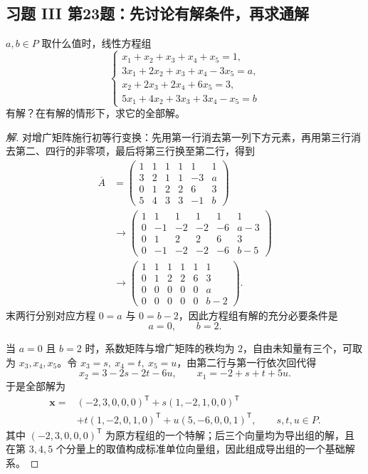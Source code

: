 \documentclass[UTF8, fontset=fandol, a4paper, 12pt]{ctexart}
\newcommand{\vx}{\boldsymbol{x}}
\theoremstyle{definition}
\begin{document}
\subsection{习题 III 第23题：先讨论有解条件，再求通解}

$a,b\in P$ 取什么值时，线性方程组
\[
 \begin{cases}
 x_1+x_2+x_3+x_4+x_5=1,\\
 3x_1+2x_2+x_3+x_4-3x_5=a,\\
 x_2+2x_3+2x_4+6x_5=3,\\
 5x_1+4x_2+3x_3+3x_4-x_5=b
 \end{cases}
\]
有解？在有解的情形下，求它的全部解。

\begin{proof}[解]
对增广矩阵施行初等行变换：先用第一行消去第一列下方元素，再用第三行消去第二、四行的非零项，最后将第三行换至第二行，得到
\begin{align*}
 \overline A
 &=\left(\begin{array}{rrrrr|r}1&1&1&1&1&1\\3&2&1&1&-3&a\\0&1&2&2&6&3\\5&4&3&3&-1&b\end{array}\right)\\
 &\longrightarrow
 \left(\begin{array}{rrrrr|r}1&1&1&1&1&1\\0&-1&-2&-2&-6&a-3\\0&1&2&2&6&3\\0&-1&-2&-2&-6&b-5\end{array}\right)\\
 &\longrightarrow
 \left(\begin{array}{rrrrr|r}1&1&1&1&1&1\\0&1&2&2&6&3\\0&0&0&0&0&a\\0&0&0&0&0&b-2\end{array}\right).
\end{align*}
末两行分别对应方程 $0=a$ 与 $0=b-2$，因此方程组有解的充分必要条件是
\[
 \boxed{a=0,\qquad b=2.}
\]

当 $a=0$ 且 $b=2$ 时，系数矩阵与增广矩阵的秩均为 $2$，自由未知量有三个，可取为 $x_3,x_4,x_5$。令 $x_3=s,\ x_4=t,\ x_5=u$，由第二行与第一行依次回代得
\[
 x_2=3-2s-2t-6u,\qquad x_1=-2+s+t+5u.
\]
于是全部解为
\begin{align*}
 \vx={}&(-2,3,0,0,0)^{\mathsf T}
 +s(1,-2,1,0,0)^{\mathsf T}\\
 &+t(1,-2,0,1,0)^{\mathsf T}
 +u(5,-6,0,0,1)^{\mathsf T},\qquad s,t,u\in P.
\end{align*}
其中 $(-2,3,0,0,0)^{\mathsf T}$ 为原方程组的一个特解；后三个向量均为导出组的解，且在第 $3,4,5$ 个分量上的取值构成标准单位向量组，因此组成导出组的一个基础解系。
\end{proof}
\end{document}
